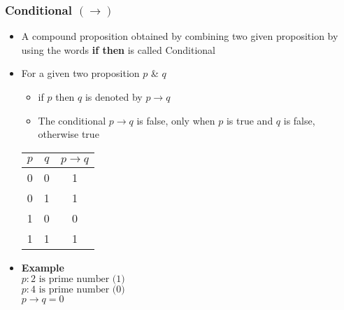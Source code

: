 \documentclass{article}
\begin{document}
	\subsubsection{Conditional $(\to)$}
	\begin{itemize}
		\item A compound proposition obtained by combining two given proposition by using the words
			\textbf{if then} is called Conditional
		\item For a given two proposition $p$ \& $q$
			\begin{itemize}
				\item if $p$ then $q$ is denoted by $p\to q$
				\item The conditional $p\to q$ is false, only when $p$ is true and $q$ is
					false, otherwise true
			\end{itemize}
			\begin{center}
				\begin{tabular}{|c|c|c|} \hline
					$p$ & $q$ & $p\to q$ \\ \hline
					0 & 0 & 1 \\
					0 & 1 & 1 \\
					1 & 0 & 0 \\
					1 & 1 & 1 \\ \hline
				\end{tabular}
			\end{center}
		\item \textbf{Example} \\
			$p : \text{2 is prime number (1)}$ \\
			$p : \text{4 is prime number (0)}$ \\
			$p\to q=0$
	\end{itemize}
\end{document}
